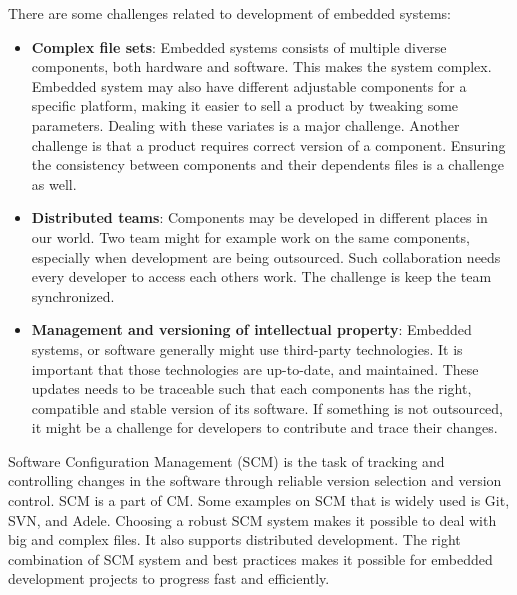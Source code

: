 There are some challenges related to development of embedded systems\cite{Estublier:2000:SCM:336512.336576}:
\begin{itemize}
	\item \textbf{Complex file sets}: Embedded systems consists of multiple diverse components, both hardware and software. This makes the system complex. Embedded system may also have different adjustable components for a specific platform, making it easier to sell a product by tweaking some parameters. Dealing with these variates is a major challenge. Another challenge is that a product requires correct version of a component. Ensuring the consistency between components and their dependents files is a challenge as well.
	\item \textbf{Distributed teams}: Components may be developed in different places in our world. Two team might for example work on the same components, especially when development are being outsourced. Such collaboration needs every developer to access each others work. The challenge is keep the team synchronized. 
	\item \textbf{Management and versioning of intellectual property}: Embedded systems, or software generally might use third-party technologies. It is important that those technologies are up-to-date, and maintained. These updates needs to be traceable such that each components has the right, compatible and stable version of its software. If something is not outsourced, it might be a challenge for developers to contribute and trace their changes.
\end{itemize}

Software Configuration Management (SCM) is the task of tracking and controlling changes in the software through reliable version selection and version control. SCM is a part of CM. Some examples on SCM that is widely used is Git, SVN, and Adele. Choosing a robust SCM system makes it possible to deal with big and complex files. It also supports distributed development. The right combination of SCM system and best practices makes it possible for embedded development projects to progress fast and efficiently. 



			

